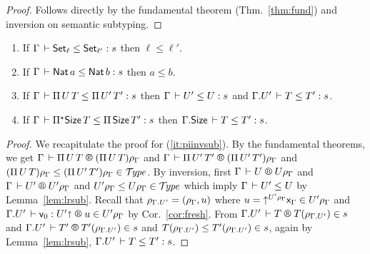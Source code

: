 \documentclass[acmlarge,review,anonymous]{acmart}\settopmatter{printfolios=true}
\newcommand{\LONGVERSION}[1]{}
\begin{document}
\begin{proof}
  Follows directly by the fundamental theorem (Thm.~\ref{thm:fund}) and inversion on semantic subtyping.
\end{proof}



\begin{lemma}
\label{lem:invsubty}
\bla
\begin{enumerate}
\item \label{it:setinvsub}
  If\/ $\Gamma \der \Set[\ell] \leq \Set[\ell'] : s$ then $\ell \leq \ell'$.
\item \label{it:natinvsub}
  If\/ $\Gamma \der \Nat a \leq \Nat b : s$ then $a \leq b$.
\item \label{it:piinvsub}
  If\/ $\Gamma \der \piT U T \leq \piT{U'}{T'} : s$ then
  $\Gamma \der U' \leq U : s$ and
  $\cext \Gamma {U'} \der T \leq T' : s$.
\item \label{it:allinvsub}
  If\/ $\Gamma \der \epiT \Size T \leq \piT{\Size}{T'} : s$ then
  $\cext \Gamma \Size \der T \leq T' : s$.
\end{enumerate}
\end{lemma}
\begin{proof}
\LONGVERSION{Similar to the proof of Cor.~\ref{cor:piinj}, using
  Lemma~\ref{lem:lrsub}.} %
We recapitulate the proof for (\ref{it:piinvsub}).
By the fundamental theorems, we get
$\RG \Gamma {\piT U T} {(\piT U T)\rhog}$ and
$\RG \Gamma {\piT {U'} {T'}} {(\piT {U'} {T'})\rhog}$ and
${(\piT U T)\rhog} \leq {(\piT {U'} {T'})\rhog} \in \TYPE$.
By inversion, first
$\RG \Gamma U {U\rhog}$ and
$\RG \Gamma {U'} {U'\rhog}$ and
$U'\rhog \leq U\rhog \in \TYPE$ which imply $\Gamma \der U' \leq U$ by Lemma~\ref{lem:lrsub}.
Recall that
$\rhogup = (\rhog, u)$ where
$u = \up{U'\rhog} \var\Gamma \in U'\rhog$ and
$\LR {\cext \Gamma U'} {\ind0} {U'\slift} {u} {U'\rhog}$ by Cor.~\ref{cor:fresh}.
From
$\LRTS {\cext \Gamma U'} T {T(\rhogup)} s$ and
$\LRTS {\cext \Gamma U'} {T'} {T'(\rhogup)} s$ and
$T(\rhogup) \leq T'(\rhogup) \in s$, again by Lemma~\ref{lem:lrsub},
$\cext \Gamma {U'} \der T \leq T' : s$.
\end{proof}
\end{document}
